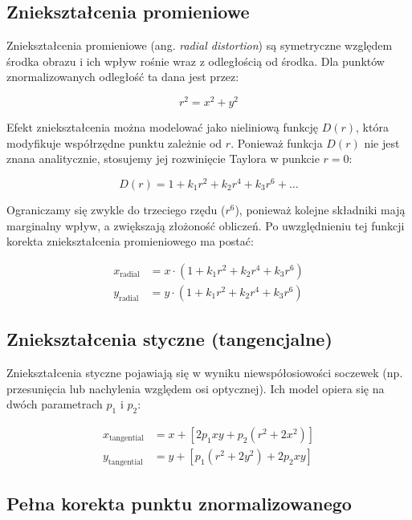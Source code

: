 \documentclass[magisterska]{pracadypl}
\begin{document}
\subsection*{Zniekształcenia promieniowe}

Zniekształcenia promieniowe (ang. \textit{radial distortion}) \cite{promieniowe} są symetryczne względem środka obrazu i ich wpływ rośnie wraz z odległością od środka. Dla punktów znormalizowanych odległość ta dana jest przez:

\[
r^2 = x^2 + y^2
\]

Efekt zniekształcenia można modelować jako nieliniową funkcję \( D(r) \), która modyfikuje współrzędne punktu zależnie od \( r \). Ponieważ funkcja \( D(r) \) nie jest znana analitycznie, stosujemy jej rozwinięcie Taylora w punkcie \( r = 0 \):

\[
D(r) = 1 + k_1 r^2 + k_2 r^4 + k_3 r^6 + \ldots
\]

Ograniczamy się zwykle do trzeciego rzędu (\( r^6 \)), ponieważ kolejne składniki mają marginalny wpływ, a zwiększają złożoność obliczeń. Po uwzględnieniu tej funkcji korekta zniekształcenia promieniowego ma postać:

\begin{align*}
x_{\text{radial}} &= x \cdot \left(1 + k_1 r^2 + k_2 r^4 + k_3 r^6 \right) \\
y_{\text{radial}} &= y \cdot \left(1 + k_1 r^2 + k_2 r^4 + k_3 r^6 \right)
\end{align*}

\subsection*{Zniekształcenia styczne (tangencjalne)}

Zniekształcenia styczne pojawiają się w wyniku niewspółosiowości soczewek (np. przesunięcia lub nachylenia względem osi optycznej). Ich model opiera się na dwóch parametrach \( p_1 \) i \( p_2 \):

\begin{align*}
x_{\text{tangential}} &= x + \left[2p_1 x y + p_2 (r^2 + 2x^2)\right] \\
y_{\text{tangential}} &= y + \left[p_1 (r^2 + 2y^2) + 2p_2 x y\right]
\end{align*}

\subsection*{Pełna korekta punktu znormalizowanego}
\end{document}
